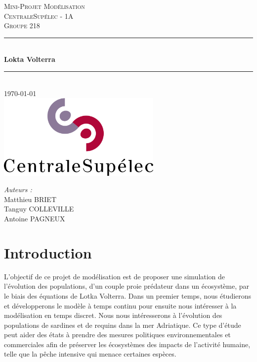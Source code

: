 \documentclass[a4paper, 11pt]{report}%
\begin{document}
    \begin{titlepage}
        \newcommand{\HRule}{\rule{\linewidth}{0.5mm}}
        \begin{center}
            \textsc{\LARGE{} Mini-Projet Modélisation} \\[0.5cm] 
            \textsc{\Large{} CentraleSupélec - 1A} \\[0.5cm]
            \textsc{\large{} Groupe 218} \\[0.5cm] 
            \HRule \\[0.6cm]
            {\huge\bfseries{} Lokta Volterra} \\[0.25cm]
            \HRule \\[1.5cm]
            {\large\today} \\[2cm] 
            \includegraphics[width=8cm]{images/cs.png}
            \\[2cm] 
        \end{center}
        \vfill{}
        \begin{minipage}{0.45\linewidth}
            \begin{flushleft}
                \Large\textit{Auteurs :} \\
                Matthieu \textsc{BRIET} \\
                Tanguy \textsc{COLLEVILLE} \\
                Antoine \textsc{PAGNEUX} 
            \end{flushleft}
        \end{minipage}
    \end{titlepage}

    \tableofcontents
    \listoffigures

    \newpage
    \section{Introduction}
        L'objectif de ce projet de modélisation est de proposer une simulation de l'évolution des populations,  
        d'un couple proie prédateur dans un écosystème, par le biais des équations de Lotka Volterra. Dans un premier temps,
        nous étudierons et développerons  le modèle à temps continu pour ensuite nous intéresser à la modélisation
        en temps discret. Nous nous intéresserons à l'évolution des populations de sardines et de requins
        dans la mer Adriatique. Ce type d'étude peut aider des états à prendre des mesures politiques environnementales 
        et commerciales afin de préserver les écosystèmes des impacts de l'activité humaine, telle que la pêche intensive
        qui menace certaines espèces. 
\end{document}

